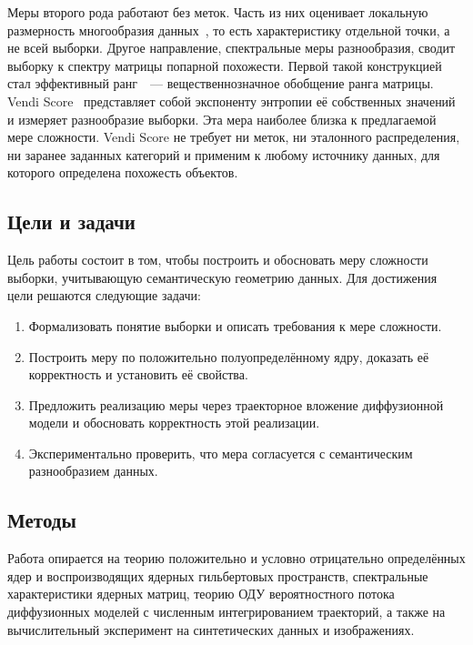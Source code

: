 \documentclass[14pt, a4paper]{extarticle}
\theoremstyle{definition}
\theoremstyle{plain}
\begin{document}
Меры второго рода работают без меток. Часть из них оценивает локальную размерность
многообразия данных~\cite{Tempczyk2022LIDL,Kamkari2024Geometric}, то есть
характеристику отдельной точки, а не всей выборки. Другое направление, спектральные
меры разнообразия, сводит выборку к спектру матрицы попарной похожести. Первой
такой конструкцией стал эффективный ранг~\cite{RoyVetterli2007EffectiveRank}~---
вещественнозначное обобщение ранга матрицы. Vendi Score~\cite{FriedmanDieng2023Vendi}
представляет собой экспоненту энтропии её собственных значений и измеряет
разнообразие выборки. Эта мера наиболее близка к предлагаемой мере сложности. Vendi Score не требует ни меток, ни эталонного распределения, ни
заранее заданных категорий и применим к любому источнику данных, для которого
определена похожесть объектов.


\subsection{Цели и задачи}

Цель работы состоит в том, чтобы построить и обосновать меру сложности
выборки, учитывающую семантическую геометрию данных. Для достижения цели решаются
следующие задачи:
\begin{enumerate}
    \item Формализовать понятие выборки и описать требования к мере сложности.
    \item Построить меру по положительно полуопределённому ядру, доказать её
          корректность и установить её свойства.
    \item Предложить реализацию меры через траекторное вложение диффузионной
          модели и обосновать корректность этой реализации.
    \item Экспериментально проверить, что мера согласуется с семантическим
          разнообразием данных.
\end{enumerate}

\subsection{Методы}

Работа опирается на теорию положительно и условно
отрицательно определённых ядер и воспроизводящих ядерных гильбертовых пространств,
спектральные характеристики ядерных матриц, теорию ОДУ вероятностного потока
диффузионных моделей с численным интегрированием траекторий, а также на
вычислительный эксперимент на синтетических данных и изображениях.
\end{document}
